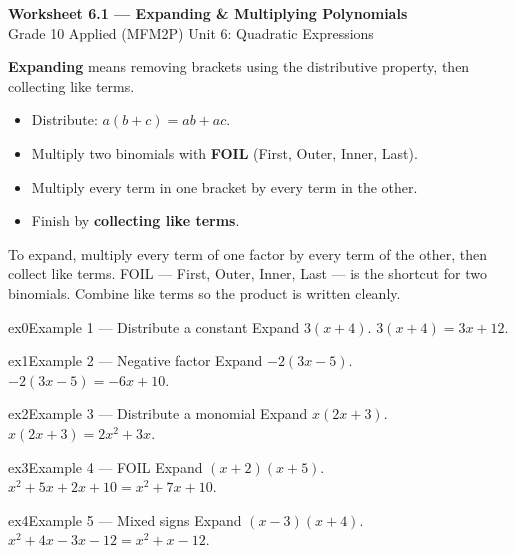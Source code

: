 \documentclass[11pt]{article}
\begin{document}
\begin{center}
{\LARGE\bfseries\color{titleblue}Worksheet 6.1 --- Expanding \& Multiplying Polynomials}\\[2pt]
{\small Grade 10 Applied (MFM2P) \textperiodcentered{} Unit 6: Quadratic Expressions}
\end{center}

\begin{ideabox}
\textbf{Expanding} means removing brackets using the distributive property, then collecting like terms.
\begin{itemize}[leftmargin=*,itemsep=2pt]
  \item Distribute: $a(b+c)=ab+ac$.
  \item Multiply two binomials with \textbf{FOIL} (First, Outer, Inner, Last).
  \item Multiply every term in one bracket by every term in the other.
  \item Finish by \textbf{collecting like terms}.
\end{itemize}
\end{ideabox}

\begin{learnbox}
To expand, multiply every term of one factor by every term of the other, then collect like terms.
FOIL — First, Outer, Inner, Last — is the shortcut for two binomials.
Combine like terms so the product is written cleanly.
\end{learnbox}


\begin{example}{ex0}{Example 1 --- Distribute a constant}
Expand $3(x+4)$.
\soln $3(x+4)=3x+12.$
\end{example}

\begin{example}{ex1}{Example 2 --- Negative factor}
Expand $-2(3x-5)$.
\soln $-2(3x-5)=-6x+10.$
\end{example}

\begin{example}{ex2}{Example 3 --- Distribute a monomial}
Expand $x(2x+3)$.
\soln $x(2x+3)=2x^2+3x.$
\end{example}

\begin{example}{ex3}{Example 4 --- FOIL}
Expand $(x+2)(x+5)$.
\soln $x^2+5x+2x+10=x^2+7x+10.$
\end{example}

\begin{example}{ex4}{Example 5 --- Mixed signs}
Expand $(x-3)(x+4)$.
\soln $x^2+4x-3x-12=x^2+x-12.$
\end{example}
\end{document}
